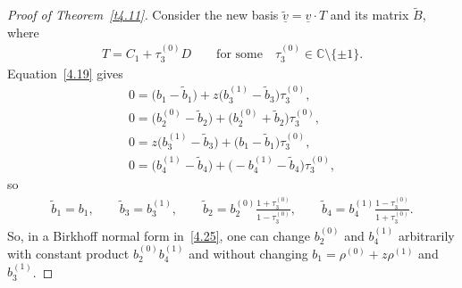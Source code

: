 \documentclass[pdftex]{sigma}%
\numberwithin{equation}{section}
\numberwithin{figure}{section}
\newcommand{\C}{{\mathbb C}}
\newcommand{\www}{\widetilde}
\newcommand{\uuuu}{\underline}
\begin{document}
\begin{proof}[Proof of Theorem~\ref{t4.11}]
Consider the new basis $\uuuu{\www v}=\uuuu{v}\cdot T$
and its matrix $\www B$, where
\begin{gather*}%
T=C_1+\tau_3^{(0)}D \qquad\text{for some}\quad \tau_3^{(0)}\in\C\setminus\{\pm 1\}.
\end{gather*}
Equation~\eqref{4.19} gives
\begin{gather*}
0= \big(b_1-\www b_1\big)+z\big(b_3^{(1)}-\www b_3\big)\tau_3^{(0)},
\\
0= \big(b_2^{(0)}-\www b_2\big)+\big(b_2^{(0)}+\www b_2\big)\tau_3^{(0)},
\\
0= z\big(b_3^{(1)}-\www b_3\big)+\big(b_1-\www b_1\big)\tau_3^{(0)},
\\
0= \big(b_4^{(1)}-\www b_4\big) + \big({-}b_4^{(1)}-\www b_4\big)\tau_3^{(0)},
\end{gather*}
so
\begin{gather}\label{4.33}
\www b_1= b_1,\qquad
\www b_3=b_3^{(1)},\qquad
\www b_2= b_2^{(0)}\frac{1+\tau_3^{(0)}}{1-\tau_3^{(0)}},\qquad
 \www b_4= b_4^{(1)}\frac{1-\tau_3^{(0)}}{1+\tau_3^{(0)}}.
\end{gather}
So, in a Birkhoff normal form in~\eqref{4.25},
one can change $b_2^{(0)}$ and $b_4^{(1)}$ arbitrarily
with constant product $b_2^{(0)}b_4^{(1)}$ and without
changing $b_1=\rho^{(0)}+z\rho^{(1)}$ and $b_3^{(1)}$.



\end{proof}
\end{document}

